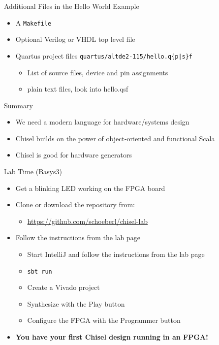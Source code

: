 \documentclass[xcolor=pdflatex,dvipsnames,table]{beamer}
\newcommand{\code}[1]{{\texttt{#1}}}
\begin{document}
\begin{frame}[fragile]{Additional Files in the Hello World Example}
\begin{itemize}
\item A \code{Makefile}
\item Optional Verilog or VHDL top level file %
\item Quartus project files \code{quartus/altde2-115/hello.q\{p|s\}f}
\begin{itemize}
\item List of source files, device and pin assignments
\item plain text files, look into hello.qsf
\end{itemize}
\end{itemize}
\end{frame}

\begin{frame}[fragile]{Summary}
\begin{itemize}
\item We need a modern language for hardware/systems design
\item Chisel builds on the power of object-oriented and functional Scala
\item Chisel is good for hardware generators
\end{itemize}
\end{frame}


\begin{frame}[fragile]{Lab Time (Basys3)}
\begin{itemize}
\item Get a blinking LED working on the FPGA board
\item Clone or download the repository from:
\begin{itemize}
\item \url{https://github.com/schoeberl/chisel-lab}
\end{itemize}
\item Follow the instructions from the lab page
\begin{itemize}
\item Start IntelliJ and follow the instructions from the lab page
\item \code{sbt run}
\item Create a Vivado project
\item Synthesize with the Play button
\item Configure the FPGA with the Programmer button
\end{itemize}
\item {\bf You have your first Chisel design running in an FPGA!}
\end{itemize}
\end{frame}
\end{document}

